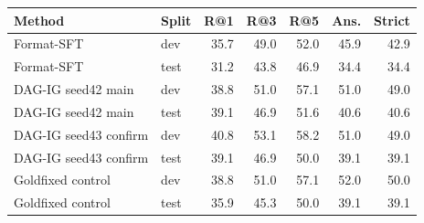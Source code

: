 \begin{tabular}{llrrrrr}
\toprule
Method & Split & R@1 & R@3 & R@5 & Ans. & Strict \\
\midrule
Format-SFT & dev & 35.7 & 49.0 & 52.0 & 45.9 & 42.9 \\
Format-SFT & test & 31.2 & 43.8 & 46.9 & 34.4 & 34.4 \\
DAG-IG seed42 main & dev & 38.8 & 51.0 & 57.1 & 51.0 & 49.0 \\
DAG-IG seed42 main & test & 39.1 & 46.9 & 51.6 & 40.6 & 40.6 \\
DAG-IG seed43 confirm & dev & 40.8 & 53.1 & 58.2 & 51.0 & 49.0 \\
DAG-IG seed43 confirm & test & 39.1 & 46.9 & 50.0 & 39.1 & 39.1 \\
Goldfixed control & dev & 38.8 & 51.0 & 57.1 & 52.0 & 50.0 \\
Goldfixed control & test & 35.9 & 45.3 & 50.0 & 39.1 & 39.1 \\
\bottomrule
\end{tabular}
